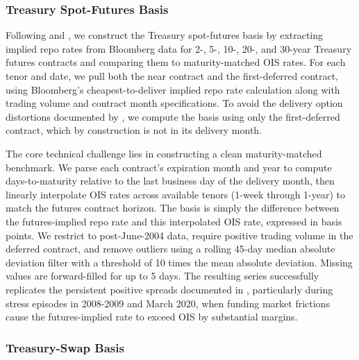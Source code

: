 \documentclass{article}
\begin{document}
\begin{appendices}
\subsubsection{Treasury Spot-Futures Basis}

Following \citet{Fleckenstein2020} and \citet{Siriwardane2021}, we construct the Treasury spot-futures basis by extracting implied repo rates from Bloomberg data for 2-, 5-, 10-, 20-, and 30-year Treasury futures contracts and comparing them to maturity-matched OIS rates. For each tenor and date, we pull both the near contract and the first-deferred contract, using Bloomberg's cheapest-to-deliver implied repo rate calculation along with trading volume and contract month specifications. To avoid the delivery option distortions documented by \citet{Burghardt2005}, we compute the basis using only the first-deferred contract, which by construction is not in its delivery month.

The core technical challenge lies in constructing a clean maturity-matched benchmark. We parse each contract's expiration month and year to compute days-to-maturity relative to the last business day of the delivery month, then linearly interpolate OIS rates across available tenors (1-week through 1-year) to match the futures contract horizon. The basis is simply the difference between the futures-implied repo rate and this interpolated OIS rate, expressed in basis points. We restrict to post-June-2004 data, require positive trading volume in the deferred contract, and remove outliers using a rolling 45-day median absolute deviation filter with a threshold of 10 times the mean absolute deviation. Missing values are forward-filled for up to 5 days. The resulting series successfully replicates the persistent positive spreads documented in \citet{Siriwardane2021}, particularly during stress episodes in 2008-2009 and March 2020, when funding market frictions cause the futures-implied rate to exceed OIS by substantial margins.

\subsubsection{Treasury-Swap Basis}


\end{appendices}
\end{document}
